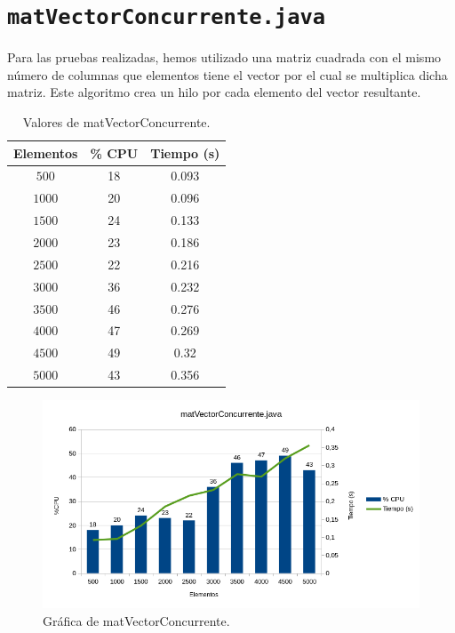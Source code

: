 \documentclass[12pt,letterpaper]{article}
\begin{document}
\newpage
\section{\texttt{matVectorConcurrente.java}}

Para las pruebas realizadas, hemos utilizado una matriz cuadrada con el mismo número de columnas que elementos tiene el vector por el cual se multiplica dicha matriz. Este algoritmo crea un hilo por cada elemento del vector resultante.
\begin{center}
	\begin{table}[htbp]
		\begin{center}
			\begin{tabular}{|c|c|c|}
				\hline
				\textbf{Elementos} & \textbf{\% CPU} & \textbf{Tiempo (s)}  \\
				\hline 
				$500$ & 18 & 0.093\\ \hline	
				$1000$ & 20 & 0.096\\ \hline
				$1500$ & 24 & 0.133\\ \hline
				$2000$ & 23 & 0.186\\ \hline
				$2500$ & 22 & 0.216\\ \hline
				$3000$ & 36 & 0.232\\ \hline
				$3500$ & 46 & 0.276\\ \hline
				$4000$ & 47 & 0.269\\ \hline
				$4500$ & 49 & 0.32\\ \hline
				$5000$ & 43 & 0.356\\ \hline		
			\end{tabular}
			\caption{Valores de matVectorConcurrente.}
			\label{tabla:Valores de matVectorConcurrente}
		\end{center}
	\end{table}
\end{center}
\begin{figure}[h]
	\begin{center}
		\includegraphics[scale=0.8]{matVectorConcurrente.png}
		\caption{Gráfica de matVectorConcurrente.}
		\label{fig: matVectorConcurrente}
	\end{center}	
\end{figure}
\end{document}
